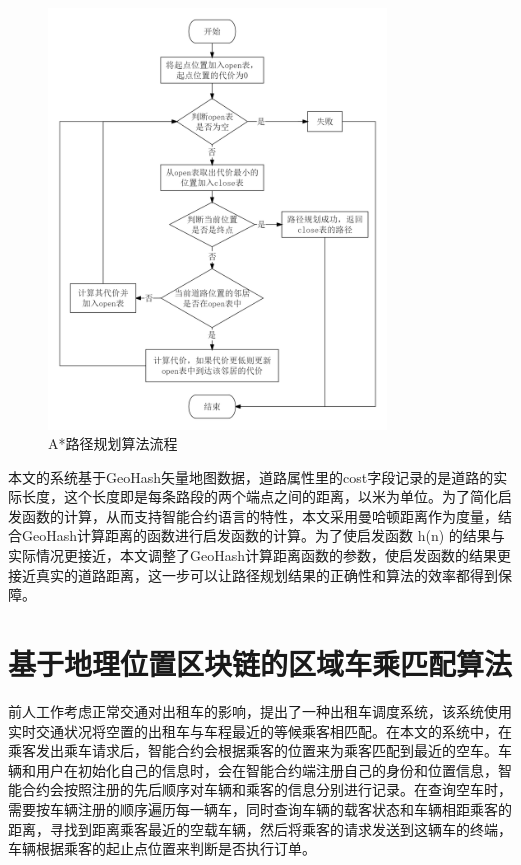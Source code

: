 \begin{figure}[h]
  \centering
  \includegraphics[width=0.8\textwidth]{figures/astar算法流程}
  \caption{A*路径规划算法流程}\label{fig:astar}
\end{figure}

本文的系统基于GeoHash矢量地图数据，道路属性里的cost字段记录的是道路的实际长度，这个长度即是每条路段的两个端点之间的距离，以米为单位。为了简化启发函数的计算，从而支持智能合约语言的特性，本文采用曼哈顿距离作为度量，结合GeoHash计算距离的函数进行启发函数的计算。为了使启发函数 h(n) 的结果与实际情况更接近，本文调整了GeoHash计算距离函数的参数，使启发函数的结果更接近真实的道路距离，这一步可以让路径规划结果的正确性和算法的效率都得到保障。

\section{基于地理位置区块链的区域车乘匹配算法}

前人工作考虑正常交通对出租车的影响，提出了一种出租车调度系统，该系统使用实时交通状况将空置的出租车与车程最近的等候乘客相匹配。在本文的系统中，在乘客发出乘车请求后，智能合约会根据乘客的位置来为乘客匹配到最近的空车。车辆和用户在初始化自己的信息时，会在智能合约端注册自己的身份和位置信息，智能合约会按照注册的先后顺序对车辆和乘客的信息分别进行记录。在查询空车时，需要按车辆注册的顺序遍历每一辆车，同时查询车辆的载客状态和车辆相距乘客的距离，寻找到距离乘客最近的空载车辆，然后将乘客的请求发送到这辆车的终端，车辆根据乘客的起止点位置来判断是否执行订单。

